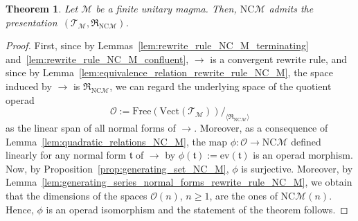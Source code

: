 \documentclass[10pt,reqno]{amsart}
\numberwithin{equation}{subsection}
\renewcommand{\geq}{\geqslant}
\newtheorem{Theorem}{Theorem}[subsection]
\newcommand{\Oca}{\mathcal{O}}
\newcommand{\Mca}{\mathcal{M}}
\newcommand{\Tfr}{\mathfrak{t}}
\newcommand{\NC}{\mathrm{NC}}
\newcommand{\Vect}{\mathrm{Vect}}
\newcommand{\Rew}{\to}
\newcommand{\Free}{\mathrm{Free}}
\newcommand{\Rel}{\mathfrak{R}}
\newcommand{\Eval}{\mathrm{ev}}
\newcommand{\Triangles}{\mathcal{T}}
\begin{document}
\begin{Theorem} \label{thm:presentation_NC_M}
    Let $\Mca$ be a finite unitary magma. Then, $\NC\Mca$ admits the
    presentation~$\left(\Triangles_\Mca, \Rel_{\NC\Mca}\right)$.
\end{Theorem}
\begin{proof}
    First, since by Lemmas~\ref{lem:rewrite_rule_NC_M_terminating}
    and~\ref{lem:rewrite_rule_NC_M_confluent}, $\Rew$ is a convergent
    rewrite rule, and since by
    Lemma~\ref{lem:equivalence_relation_rewrite_rule_NC_M}, the space
    induced by $\Rew$ is $\Rel_{\NC\Mca}$, we can regard the underlying
    space of the quotient operad
    \begin{equation}
        \Oca :=
        \Free\left(
        \Vect\left(\Triangles_\Mca\right)\right)
        /_{\langle\Rel_{\NC\Mca}\rangle}
    \end{equation}
    as the linear span of all normal forms of $\Rew$. Moreover, as a
    consequence of Lemma~\ref{lem:quadratic_relations_NC_M}, the map
    \begin{math}
        \phi : \Oca \to \NC\Mca
    \end{math}
    defined linearly for any normal form $\Tfr$ of $\Rew$ by
    $\phi(\Tfr) := \Eval(\Tfr)$ is an operad morphism. Now, by
    Proposition~\ref{prop:generating_set_NC_M}, $\phi$ is surjective.
    Moreover, by
    Lemma~\ref{lem:generating_series_normal_forms_rewrite_rule_NC_M},
    we obtain that the dimensions of the spaces $\Oca(n)$, $n \geq 1$,
    are the ones of $\NC\Mca(n)$. Hence, $\phi$ is an operad isomorphism
    and the statement of the theorem follows.
\end{proof}
\medskip
\end{document}
